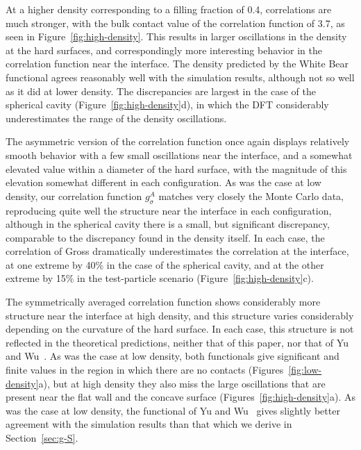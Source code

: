 \documentclass[letterpaper,twocolumn,amsmath,amssymb,pre]{revtex4-1}
\begin{document}
At a higher density corresponding to a filling fraction of 0.4,
correlations are much stronger, with the bulk contact value of the
correlation function of 3.7, as seen in
Figure~\ref{fig:high-density}.  This results in larger
oscillations in the density at the hard surfaces, and correspondingly
more interesting behavior in the correlation function near the
interface.  The density predicted by the White Bear functional agrees
reasonably well with the simulation results, although not so well as
it did at lower density.  The discrepancies are largest in the case of
the spherical cavity (Figure~\ref{fig:high-density}d), in which the DFT considerably underestimates the
range of the density oscillations.

The asymmetric version of the correlation function once again displays
relatively smooth behavior with a few small
oscillations near the interface, and a somewhat elevated value within
a diameter of the hard surface, with the magnitude of this elevation
somewhat different in each configuration.  As was the case at low
density, our correlation function $g_\sigma^A$ matches very closely
the Monte Carlo data, reproducing quite well the structure near the
interface in each configuration, although in the spherical cavity there is a small, but significant
discrepancy, comparable to the discrepancy found in the density
itself.  In each case, the correlation of Gross dramatically
underestimates the correlation at the interface, at one extreme by
40\% in the case of the spherical cavity, and at the other extreme by 15\%
in the test-particle scenario (Figure~\ref{fig:high-density}c).


The symmetrically averaged correlation function shows considerably
more structure near the interface at high density, and this structure
varies considerably depending on the curvature of the hard surface.
In each case, this structure is not reflected in the theoretical
predictions, neither that of this paper, nor that of Yu and
Wu~\cite{yu2002fmt-dft-inhomogeneous-associating}.  As was the case at
low density, both functionals give significant and finite values in
the region in which there are no contacts (Figures~\ref{fig:low-density}a), but at high density they
also miss the large oscillations that are present near the flat wall
and the concave surface (Figures~\ref{fig:high-density}a).  As was the case at low density, the
functional of Yu and Wu~\cite{yu2002fmt-dft-inhomogeneous-associating}
gives slightly better agreement with the simulation results than that
which we derive in Section~\ref{sec:g-S}.
\end{document}
